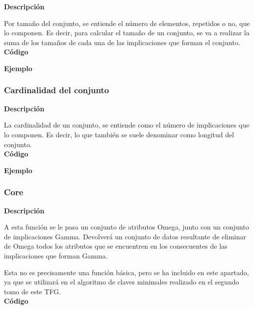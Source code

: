     \textbf{Descripci\'on}

    Por tama\~no del conjunto, se entiende el n\'umero de elementos, repetidos o no, que lo componen. 
    Es decir, para calcular el tama\~no de un conjunto, se va a realizar la suma de los tama\~nos de cada una de 
    las implicaciones que forman el conjunto.
    \\


    \textbf{C\'odigo}

    

    \textbf{Ejemplo}



\subsubsection{Cardinalidad del conjunto}

    \textbf{Descripci\'on}

    La cardinalidad de un conjunto, se entiende como el n\'umero de implicaciones que lo componen. Es decir, lo que 
    tambi\'en se suele denominar como longitud del conjunto.
    \\


    \textbf{C\'odigo}

    

    \textbf{Ejemplo}




\subsubsection{Core}

    \textbf{Descripci\'on}

    A esta funci\'on se le pasa un conjunto de atributos Omega, junto con un conjunto de implicaciones Gamma. 
    Devolver\'a un conjunto de datos resultante de eliminar de Omega todos los atributos que se encuentren en los 
    consecuentes de las implicaciones que forman Gamma. 
    
    Esta no es precisamente una funci\'on b\'asica, pero se ha incluido en este apartado, ya que se utilizar\'a 
    en el algoritmo de claves minimales realizado en el segundo tomo de este TFG.
    \\


    \textbf{C\'odigo}

    

